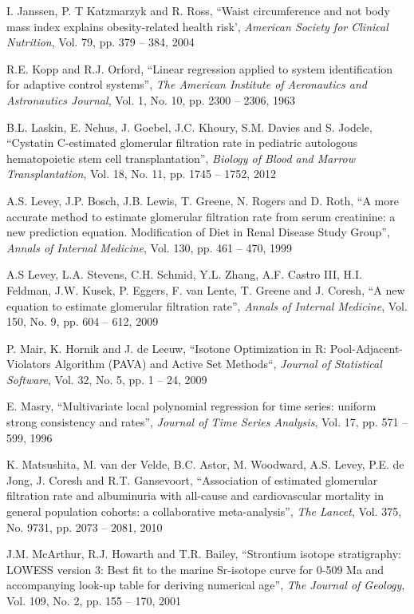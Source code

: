 \documentclass[10pt,final]{siamltex}
\begin{document}
\begin{thebibliography}{99}
   I. Janssen, P. T Katzmarzyk and R. Ross, ``Waist circumference and not body mass index explains obesity-related health risk', \textit{American Society for Clinical Nutrition}, Vol. 79, pp. 379 -- 384, 2004

   R.E. Kopp and R.J. Orford, ``Linear regression applied to system identification for adaptive control systems'', \textit{The American Institute of Aeronautics and Astronautics Journal}, Vol. 1, No. 10, pp. 2300 -- 2306, 1963

  B.L. Laskin, E. Nehus, J. Goebel, J.C. Khoury, S.M. Davies and S. Jodele, ``Cystatin C-estimated glomerular filtration rate in pediatric autologous hematopoietic stem cell transplantation'', \textit{Biology of Blood and Marrow Transplantation}, Vol. 18, No. 11, pp. 1745 -- 1752, 2012

   A.S. Levey, J.P. Bosch, J.B. Lewis, T. Greene, N. Rogers and D. Roth, ``A more accurate method to estimate glomerular filtration rate from serum creatinine: a new prediction equation. Modification of Diet in Renal Disease Study Group'', \textit{Annals of Internal Medicine}, Vol. 130, pp. 461 -- 470, 1999

   A.S Levey, L.A. Stevens, C.H. Schmid, Y.L. Zhang, A.F. Castro III, H.I. Feldman, J.W. Kusek, P. Eggers, F. van Lente, T. Greene and J. Coresh, ``A new equation to estimate glomerular filtration rate'', \textit{Annals of Internal Medicine}, Vol. 150, No. 9, pp. 604 -- 612, 2009

   P. Mair, K. Hornik and J. de Leeuw, ``Isotone Optimization in R: Pool-Adjacent-Violators Algorithm (PAVA) and Active Set Methods``, \textit{Journal of Statistical Software}, Vol. 32, No. 5, pp. 1 -- 24, 2009

   E. Masry, ``Multivariate local polynomial regression for time series: uniform strong consistency and rates'', \textit{Journal of Time Series Analysis}, Vol. 17, pp. 571 -- 599, 1996

   K. Matsushita, M. van der Velde, B.C. Astor, M. Woodward, A.S. Levey, P.E. de Jong, J. Coresh and R.T. Gansevoort, ``Association of estimated glomerular filtration rate and albuminuria with all-cause and cardiovascular mortality in general population cohorts: a collaborative meta-analysis'', \textit{The Lancet}, Vol. 375, No. 9731, pp. 2073 -- 2081, 2010

   J.M. McArthur, R.J. Howarth and T.R. Bailey, ``Strontium isotope stratigraphy: LOWESS version 3: Best fit to the marine Sr-isotope curve for 0-509 Ma and accompanying look-up table for deriving numerical age'', \textit{The Journal of Geology}, Vol. 109, No. 2, pp. 155 -- 170, 2001


\end{thebibliography}
\end{document}

